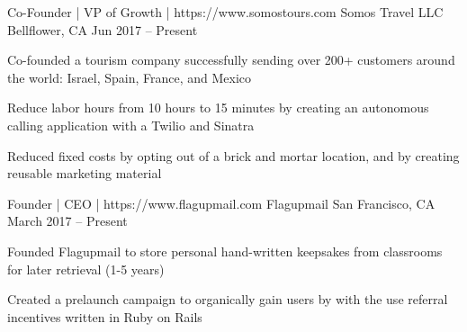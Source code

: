 \documentclass[]{awesome-cv}
\begin{document}
\begin{cventries}
	\cventry
	{Co-Founder | VP of Growth | https://www.somostours.com}
	{Somos Travel LLC}
	{Bellflower, CA}
	{Jun 2017 – Present}
	{\begin{cvitems}
		\item {Co-founded a tourism company successfully sending over 200+ customers around the world: Israel, Spain, France, and Mexico}
		\item {Reduce labor hours from 10 hours to 15 minutes by creating an autonomous calling application with a Twilio and Sinatra}
		\item {Reduced fixed costs by opting out of a brick and mortar location, and by creating reusable marketing material}
		\end{cvitems}}
	\cventry
	{Founder | CEO | https://www.flagupmail.com}
	{Flagupmail}
	{San Francisco, CA}
	{March 2017 – Present}
	{\begin{cvitems}
		\item {Founded Flagupmail to store personal hand-written keepsakes from classrooms for later retrieval (1-5 years)}
		\item {Created a prelaunch campaign to organically gain users by with the use referral incentives written in Ruby on Rails}
	\end{cvitems}}
\end{cventries}
\vspace{-5mm}
\end{document}

